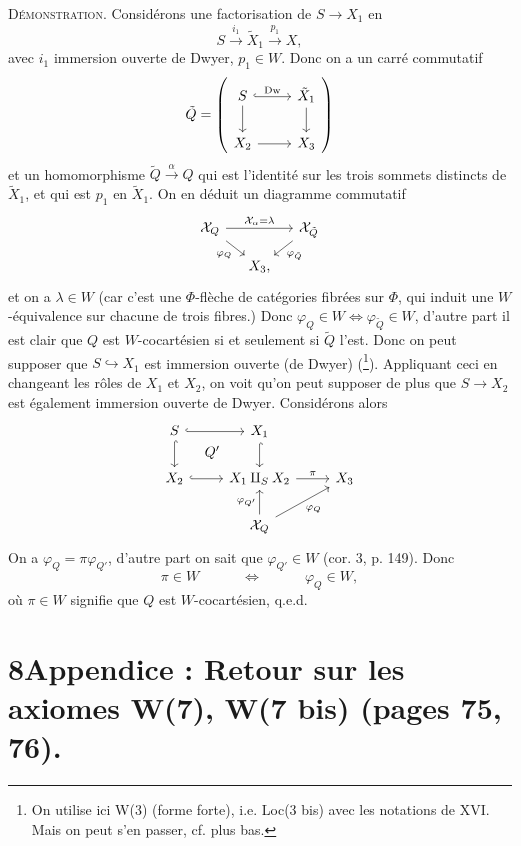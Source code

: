\documentclass[11pt]{article}
\newcommand{\printedpage}[1]{\marginpar{\footnotesize p.~#1}}
\newcommand{\msp}[1]{\marginpar{\footnotesize [#1]}}
\begin{document}
\msp{page 263}
\textsc{Démonstration.} Considérons une factorisation de $S \longrightarrow X_1$ en
\[
S \xrightarrow{i_1} \tilde{X}_1 \xrightarrow{p_1} X, %
\]
avec $i_1$ immersion ouverte de Dwyer, $p_1 \in W$. Donc on a un carré commutatif
\[
\tilde{Q} = \left(
\begin{tikzcd}
S \arrow[r, hook, "\mathrm{Dw}"] \arrow[d] & \tilde{X}_1 \arrow[d] \\
X_2 \arrow[r] & X_3
\end{tikzcd}
\right)
\]
et un homomorphisme $\tilde{Q} \xrightarrow{\alpha} Q$ qui est l'identité sur les trois sommets distincts de $\tilde{X}_1$, et qui est $p_1$ en $\tilde{X}_1$. On en déduit un diagramme commutatif
\[
\begin{tikzcd}[row sep=small, column sep=small]
\mathcal{X}_Q \arrow[rr, "\mathcal{X}_\alpha = \lambda"] \arrow[dr, "\varphi_Q"'] & & \mathcal{X}_{\tilde{Q}} \arrow[dl, "\varphi_{\tilde{Q}}"] \\
 & X_3, &
\end{tikzcd}
\]
et on a $\lambda \in W$ (car c'est une $\Phi$-flèche de catégories fibrées sur $\Phi$, qui induit une $W$-équivalence sur chacune de trois fibres.) Donc $\varphi_Q \in W \iff \varphi_{\tilde{Q}} \in W$, d'autre part il est clair que $Q$ est $W$-cocartésien si et seulement si $\tilde{Q}$ l'est. Donc on peut supposer que $S \hookrightarrow X_1$ est immersion ouverte (de Dwyer) (\footnote[134]{On utilise ici W(3) (forme forte), i.e. Loc(3 bis) avec les notations de XVI. Mais on peut s'en passer, cf. plus bas.}). Appliquant ceci
\msp{page 264}
en changeant les rôles de $X_1$ et $X_2$, on voit qu'on peut supposer de plus que $S \longrightarrow X_2$ est également immersion ouverte de Dwyer. Considérons alors
\[
\begin{tikzcd}
S \arrow[r, hook] \arrow[d, hook] \arrow[dr, phantom, "Q'"] & X_1 \arrow[d, hook] & \\
X_2 \arrow[r, hook] & X_1 \amalg_S X_2 \arrow[r, "\pi"] & X_3 \\
 & \mathcal{X}_Q \arrow[u, "\varphi_{Q'}"] \arrow[ur, "\varphi_Q"'] &
\end{tikzcd}
\]
\printedpage{172}
On a $\varphi_Q = \pi\varphi_{Q'}$, d'autre part on sait que $\varphi_{Q'} \in W$ (cor. 3, p. 149). Donc
\[
\pi \in W \qquad\quad \iff \qquad\quad \varphi_Q \in W,
\]
où $\pi \in W$ signifie que $Q$ est $W$-cocartésien, q.e.d.

\msp{page 265}

\section*{8\quad Appendice : Retour sur les axiomes W(7), W(7 bis) (pages 75, 76).}
\end{document}
